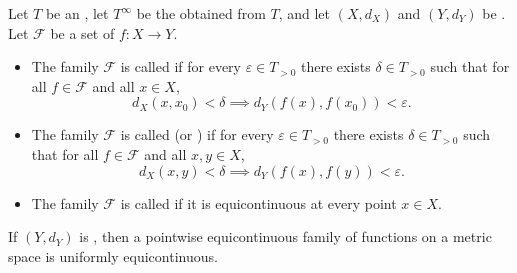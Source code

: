 \begin{definition} \label{definition:equicontinuous_family_of_functions_between_metric_spaces_valued_in_ordered_commutative_monoid_with_adjoined_infinity}
    Let $T$ be an , let $T^\infty$ be the  obtained from $T$, and let $(X, d_X)$ and $(Y, d_Y)$ be . Let $\mathcal{F}$ be a set of  $f : X \to Y$.

    \begin{itemize}
        \item The family $\mathcal{F}$ is called  if for every $\varepsilon \in T_{>0}$ there exists $\delta \in T_{>0}$ such that for all $f \in \mathcal{F}$ and all $x \in X$,
        $$d_X(x, x_0) < \delta \implies d_Y(f(x), f(x_0)) < \varepsilon.$$

        \item The family $\mathcal{F}$ is called  (or ) if for every $\varepsilon \in T_{>0}$ there exists $\delta \in T_{>0}$ such that for all $f \in \mathcal{F}$ and all $x, y \in X$,
        $$d_X(x, y) < \delta \implies d_Y(f(x), f(y)) < \varepsilon.$$

        \item The family $\mathcal{F}$ is called  if it is equicontinuous at every point $x \in X$.
    \end{itemize}

    If $(Y, d_Y)$ is , then a pointwise equicontinuous family of functions on a  metric space is uniformly equicontinuous.
\end{definition}